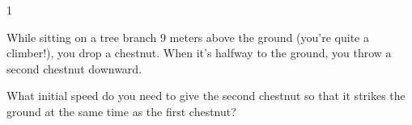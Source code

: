 
\AddToShipoutPicture*{\BackgroundPic}

\addtocounter {ProbNum} {1}

 
{\bf \Large{}} While sitting on a tree branch 9 meters above the ground (you're quite a climber!), you drop a chestnut.  When it's halfway to the ground, you throw a second chestnut downward.  \bigskip

What initial speed do you need to give the second chestnut so that it strikes the ground at the same time as the first chestnut?\paragraph{}
\noindent
\vfill



\newpage